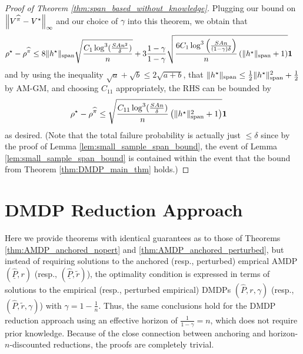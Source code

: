 \documentclass{article}
\theoremstyle{plain}
\theoremstyle{plain}
\theoremstyle{remark}
\theoremstyle{plain}
\theoremstyle{plain}
\newcommand{\Phat}{\widehat{P}}
\newcommand{\one}{\mathbf{1}}
\newcommand{\pihat}{\widehat{\pi}}
\newcommand{\Phatanc}{\underline{\Phat}}
\begin{document}
\begin{proof}[Proof of Theorem \ref{thm:span_based_without_knowledge}]
    Plugging our bound on $\infnorm{V^{\pihat} - V^\star}$ and our choice of $\gamma$ into this theorem, we obtain that
    \begin{align*}
        \rho^\star - \rho^{\pihat} & \leq 8\spannorm{h^\star} \sqrt{\frac{C_1 \log^3(\frac{SAn^2}{\delta})}{n}} + 3 \frac{1-\gamma}{1-\gamma} \sqrt{\frac{6C_1  \log^3 \left( \frac{SAn}{(1-\gamma) \delta}\right) }{n}\left(\spannorm{h^\star} + 1\right) } \one
    \end{align*}
    and by using the inequality $\sqrt{a} + \sqrt{b} \leq 2 \sqrt{a + b}$, that $\Vert h^\star\Vert _{\textnormal{span}} \leq \frac{1}{2}\Vert h^\star\Vert _{\textnormal{span}}^2 + \frac{1}{2}$ by AM-GM, and choosing $C_{11}$ appropriately, the RHS can be bounded by
    \begin{align*}
        \rho^\star - \rho^{\pihat} & \leq \sqrt{\frac{C_{11}\log^3(\frac{SAn}{\delta})}{n} \left( \spannorm{h^\star}^2 + 1\right)} \one
    \end{align*}
    as desired. (Note that the total failure probability is actually just $\leq \delta$ since by the proof of Lemma \ref{lem:small_sample_span_bound}, the event of Lemma \ref{lem:small_sample_span_bound} is contained within the event that the bound from Theorem \ref{thm:DMDP_main_thm} holds.)
\end{proof}

\section{DMDP Reduction Approach}
\label{sec:DMDP_reduction_approach}
Here we provide theorems with identical guarantees as to those of Theorems \ref{thm:AMDP_anchored_nopert} and \ref{thm:AMDP_anchored_perturbed}, but instead of requiring solutions to the anchored (resp., perturbed) emprical AMDP $(\Phatanc, r)$ (resp., $(\Phatanc, \widetilde{r})$), the optimality condition is expressed in terms of solutions to the empirical (resp., perturbed empirical) DMDPs $(\Phat, r, \gamma)$ (resp., $(\Phat, \widetilde{r}, \gamma)$) with $\gamma = 1 - \frac{1}{n}$. Thus, the same conclusions hold for the DMDP reduction approach using an effective horizon of $\frac{1}{1-\gamma} = n$, which does not require prior knowledge. Because of the close connection between anchoring and horizon-$n$-discounted reductions, the proofs are completely trivial.
\end{document}

